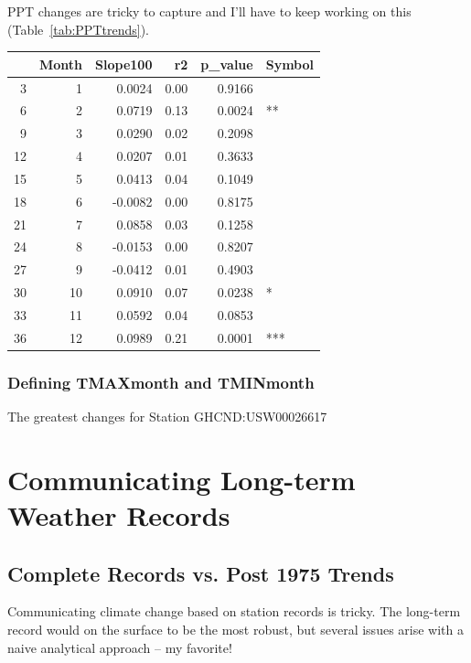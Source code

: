 \documentclass{article}\usepackage[]{graphicx}\usepackage[]{color}
\begin{document}
PPT changes are tricky to capture and I'll have to keep working on this (Table~\ref{tab:PPTtrends}).

\begin{table}[ht]
\centering
\begin{tabular}{rrrrrl}
  \hline
 & Month & Slope100 & r2 & p\_value & Symbol \\ 
  \hline
3 & 1 & 0.0024 & 0.00 & 0.9166 &  \\ 
  6 & 2 & 0.0719 & 0.13 & 0.0024 & ** \\ 
  9 & 3 & 0.0290 & 0.02 & 0.2098 &  \\ 
  12 & 4 & 0.0207 & 0.01 & 0.3633 &  \\ 
  15 & 5 & 0.0413 & 0.04 & 0.1049 &  \\ 
  18 & 6 & -0.0082 & 0.00 & 0.8175 &  \\ 
  21 & 7 & 0.0858 & 0.03 & 0.1258 &  \\ 
  24 & 8 & -0.0153 & 0.00 & 0.8207 &  \\ 
  27 & 9 & -0.0412 & 0.01 & 0.4903 &  \\ 
  30 & 10 & 0.0910 & 0.07 & 0.0238 & * \\ 
  33 & 11 & 0.0592 & 0.04 & 0.0853 &  \\ 
  36 & 12 & 0.0989 & 0.21 & 0.0001 & *** \\ 
   \hline
\end{tabular}
\end{table}


\subsubsection{Defining TMAXmonth and TMINmonth}


The greatest changes for Station GHCND:USW00026617

\section{Communicating Long-term Weather Records}

\subsection{Complete Records vs. Post 1975 Trends}

Communicating climate change based on station records is tricky. The long-term record would on the surface to be the most robust, but several issues arise with a naive analytical approach -- my favorite!
\end{document}

